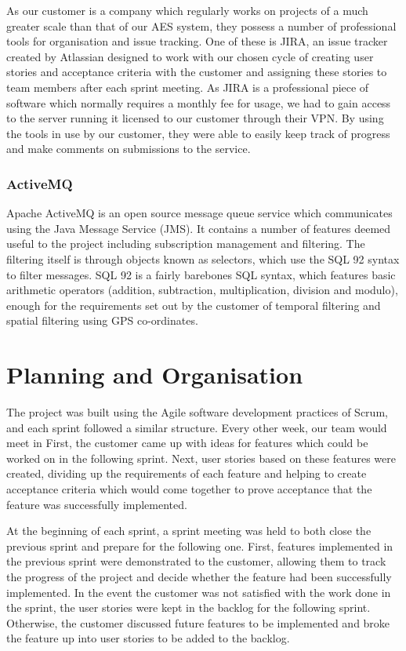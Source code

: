 \documentclass[a4paper, 12pt]{article}
\begin{document}
As our customer is a company which regularly works on projects of a much greater scale than that of our AES system, they possess a number of professional tools for organisation and issue tracking. One of these is JIRA, an issue tracker created by Atlassian designed to work with our chosen cycle of creating user stories and acceptance criteria with the customer and assigning these stories to team members after each sprint meeting. As JIRA is a professional piece of software which normally requires a monthly fee for usage, we had to gain access to the server running it licensed to our customer through their VPN. By using the tools in use by our customer, they were able to easily keep track of progress and make comments on submissions to the service.

\subsubsection{ActiveMQ}

Apache ActiveMQ is an open source message queue service which communicates using the Java Message Service (JMS). It contains a number of features deemed useful to the project including subscription management and filtering. The filtering itself is through objects known as selectors, which use the SQL 92 syntax to filter messages. SQL 92 is a fairly barebones SQL syntax, which features basic arithmetic operators (addition, subtraction, multiplication, division and modulo), enough for the requirements set out by the customer of temporal filtering and spatial filtering using GPS co-ordinates.

\newpage

\section{Planning and Organisation}
\label{sec:planning}

The project was built using the Agile software development practices of Scrum, and each sprint followed a similar structure. Every other week, our team would meet in  First, the customer came up with ideas for features which could be worked on in the following sprint. Next, user stories based on these features were created, dividing up the requirements of each feature and helping to create acceptance criteria which would come together to prove acceptance that the feature was successfully implemented.

At the beginning of each sprint, a sprint meeting was held to both close the previous sprint and prepare for the following one. First, features implemented in the previous sprint were demonstrated to the customer, allowing them to track the progress of the project and decide whether the feature had been successfully implemented. In the event the customer was not satisfied with the work done in the sprint, the user stories were kept in the backlog for the following sprint. Otherwise, the customer discussed future features to be implemented and broke the feature up into user stories to be added to the backlog.
\end{document}
